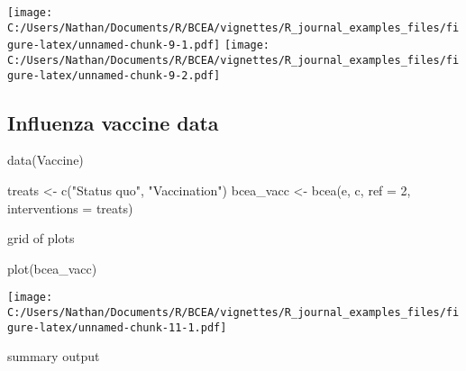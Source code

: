 \documentclass[
]{article}
\newenvironment{Shaded}{\begin{snugshade}}{\end{snugshade}}
\newcommand{\AttributeTok}[1]{\textcolor[rgb]{0.77,0.63,0.00}{#1}}
\newcommand{\DecValTok}[1]{\textcolor[rgb]{0.00,0.00,0.81}{#1}}
\newcommand{\FunctionTok}[1]{\textcolor[rgb]{0.00,0.00,0.00}{#1}}
\newcommand{\NormalTok}[1]{#1}
\newcommand{\OtherTok}[1]{\textcolor[rgb]{0.56,0.35,0.01}{#1}}
\newcommand{\StringTok}[1]{\textcolor[rgb]{0.31,0.60,0.02}{#1}}
\begin{document}
\texttt{[image: C:/Users/Nathan/Documents/R/BCEA/vignettes/R\_journal\_examples\_files/figure-latex/unnamed-chunk-9-1.pdf]}
\texttt{[image: C:/Users/Nathan/Documents/R/BCEA/vignettes/R\_journal\_examples\_files/figure-latex/unnamed-chunk-9-2.pdf]}

\hypertarget{influenza-vaccine-data}{%
\subsection{Influenza vaccine data}\label{influenza-vaccine-data}}

\begin{Shaded}
\begin{Highlighting}[]
\FunctionTok{data}\NormalTok{(Vaccine)}

\NormalTok{treats }\OtherTok{\textless{}{-}} \FunctionTok{c}\NormalTok{(}\StringTok{"Status quo"}\NormalTok{, }\StringTok{"Vaccination"}\NormalTok{)}
\NormalTok{bcea\_vacc }\OtherTok{\textless{}{-}} \FunctionTok{bcea}\NormalTok{(e, c, }\AttributeTok{ref =} \DecValTok{2}\NormalTok{, }\AttributeTok{interventions =}\NormalTok{ treats)}
\end{Highlighting}
\end{Shaded}

grid of plots

\begin{Shaded}
\begin{Highlighting}[]
\FunctionTok{plot}\NormalTok{(bcea\_vacc)}
\end{Highlighting}
\end{Shaded}

\texttt{[image: C:/Users/Nathan/Documents/R/BCEA/vignettes/R\_journal\_examples\_files/figure-latex/unnamed-chunk-11-1.pdf]}

summary output
\end{document}
